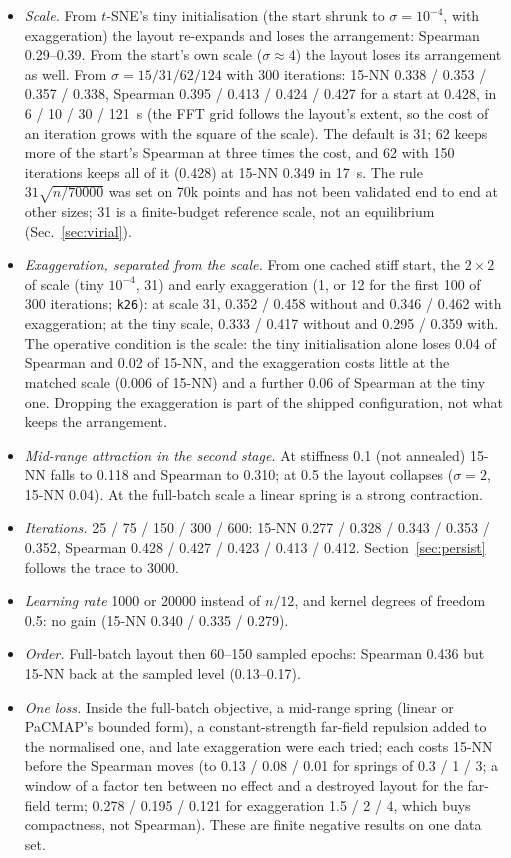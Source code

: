 \documentclass[11pt]{article}
\begin{document}
\begin{itemize}[leftmargin=1.5em]
\item \emph{Scale.} From $t$-SNE's tiny initialisation (the start shrunk to $\sigma = 10^{-4}$, with
  exaggeration) the layout re-expands and loses the arrangement: Spearman 0.29--0.39. From the start's
  own scale ($\sigma \approx 4$) the layout loses its arrangement as well. From $\sigma = 15 / 31 / 62 /
  124$ with 300 iterations: 15-NN 0.338 / 0.353 / 0.357 / 0.338, Spearman 0.395 / 0.413 / 0.424 / 0.427
  for a start at 0.428, in 6 / 10 / 30 / 121~s (the FFT grid follows the layout's extent, so the cost of
  an iteration grows with the square of the scale). The default is 31; 62 keeps more of the start's
  Spearman at three times the cost, and 62 with 150 iterations keeps all of it (0.428) at 15-NN 0.349 in
  17~s. The rule $31 \sqrt{n / 70000}$ was set on 70k points and has not been validated end to end at
  other sizes; 31 is a finite-budget reference scale, not an equilibrium (Sec.~\ref{sec:virial}).
\item \emph{Exaggeration, separated from the scale.} From one cached stiff start, the $2 \times 2$ of
  scale (tiny $10^{-4}$, 31) and early exaggeration (1, or 12 for the first 100 of 300 iterations;
  \texttt{k26}): at scale 31, 0.352 / 0.458 without and 0.346 / 0.462 with exaggeration; at the tiny
  scale, 0.333 / 0.417 without and 0.295 / 0.359 with. The operative condition is the scale: the tiny
  initialisation alone loses 0.04 of Spearman and 0.02 of 15-NN, and the exaggeration costs little at
  the matched scale (0.006 of 15-NN) and a further 0.06 of Spearman at the tiny one. Dropping the
  exaggeration is part of the shipped configuration, not what keeps the arrangement.
\item \emph{Mid-range attraction in the second stage.} At stiffness 0.1 (not annealed) 15-NN falls to
  0.118 and Spearman to 0.310; at 0.5 the layout collapses ($\sigma = 2$, 15-NN 0.04). At the full-batch
  scale a linear spring is a strong contraction.
\item \emph{Iterations.} 25 / 75 / 150 / 300 / 600: 15-NN 0.277 / 0.328 / 0.343 / 0.353 / 0.352,
  Spearman 0.428 / 0.427 / 0.423 / 0.413 / 0.412. Section~\ref{sec:persist} follows the trace to 3000.
\item \emph{Learning rate} 1000 or 20000 instead of $n / 12$, and kernel degrees of freedom 0.5: no
  gain (15-NN 0.340 / 0.335 / 0.279).
\item \emph{Order.} Full-batch layout then 60--150 sampled epochs: Spearman 0.436 but 15-NN back at the
  sampled level (0.13--0.17).
\item \emph{One loss.} Inside the full-batch objective, a mid-range spring (linear or PaCMAP's bounded
  form), a constant-strength far-field repulsion added to the normalised one, and late exaggeration were
  each tried; each costs 15-NN before the Spearman moves (to 0.13 / 0.08 / 0.01 for springs of 0.3 / 1 /
  3; a window of a factor ten between no effect and a destroyed layout for the far-field term; 0.278 /
  0.195 / 0.121 for exaggeration 1.5 / 2 / 4, which buys compactness, not Spearman). These are finite
  negative results on one data set.
\end{itemize}
\end{document}
